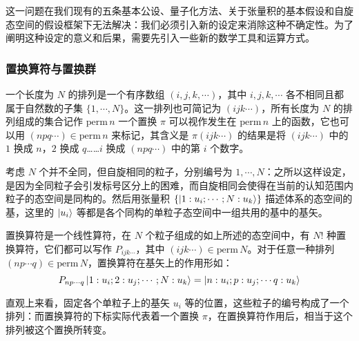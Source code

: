 \documentclass[cn,10pt,math=newtx,citestyle=gb7714-2015,bibstyle=gb7714-2015]{elegantbook}
\begin{document}
这一问题在我们现有的五条基本公设、量子化方法、关于张量积的基本假设和自旋态空间的假设框架下无法解决：我们必须引入新的设定来消除这种不确定性。为了阐明这种设定的意义和后果，需要先引入一些新的数学工具和运算方式。

\subsubsection{置换算符与置换群}

\begin{definition}[置换]
    一个长度为 $N$ 的排列是一个有序数组 $(i,j,k,\cdots)$，其中 $i,j,k,\cdots$ 各不相同且都属于自然数的子集 $\{1,\cdots,N\}$。这一排列也可简记为 $(ijk\cdots)$，所有长度为 $N$ 的排列组成的集合记作 $\text{perm}\,n$
    一个置换 $\pi$ 可以视作发生在 $\text{perm}\,n$ 上的函数，它也可以用 $(npq\cdots)\in\text{perm}\,n$ 来标记，其含义是 $\pi(ijk\cdots)$ 的结果是将 $(ijk\cdots)$ 中的 $1$ 换成 $n$，$2$ 换成 $q$……$i$ 换成 $(npq\cdots)$ 中的第 $i$ 个数字。
\end{definition}

考虑 $N$ 个并不全同，但自旋相同的粒子，分别编号为 $1,\cdots,N$：之所以这样设定，是因为全同粒子会引发标号区分上的困难，而自旋相同会使得在当前的认知范围内粒子的态空间是同构的。然后用张量积 $\{\ket{1:u_i;\cdots;N:u_k}\}$ 描述体系的态空间的基，这里的 $\ket{u_i}$ 等都是各个同构的单粒子态空间中一组共用的基中的基矢。

\begin{definition}[置换算符]
    置换算符是一个线性算符，在 $N$ 个粒子组成的如上所述的态空间中，有 $N!$ 种置换算符，它们都可以写作 $P_{ijk\cdots}$，其中 $(ijk\cdots)\in\text{perm}\,N$。对于任意一种排列 $(np\cdots q)\in\text{perm}\,N$，置换算符在基矢上的作用形如：
    \begin{equation}
        P_{np\cdots q}\ket{1:u_i;2:u_j;\cdots;N:u_k} = \ket{n:u_i;p:u_j;\cdots q:u_k}
    \end{equation}
\end{definition}

直观上来看，固定各个单粒子上的基矢 $u_i$ 等的位置，这些粒子的编号构成了一个排列：而置换算符的下标实际代表着一个置换 $\pi$，在置换算符作用后，相当于这个排列被这个置换所转变。
\end{document}
